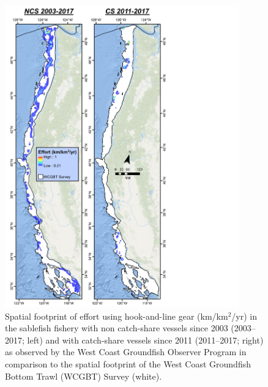 \documentclass[11pt,
  english,
  a4paper,
]{article}
\begin{document}
\begin{figure}
\centering
\includegraphics[width=0.9\textwidth,height=0.9\textheight]{figs/Sablefish_Figures_HKL_lnDens_2views_avg.pdf}
\caption{Spatial footprint of effort using hook-and-line gear (km/km{\(^2\)\leavevmode\tagmcend\tagstructend}/yr) in the sablefish fishery with non catch-share vessels since 2003 (2003--2017; left) and with catch-share vessels since 2011 (2011--2017; right) as observed by the West Coast Groundfish Observer Program in comparison to the spatial footprint of the West Coast Groundfish Bottom Trawl (WCGBT) Survey (white).\label{fig:footprint_hkl}}
\end{figure}

\tagmcend\tagstructend

\end{document}
